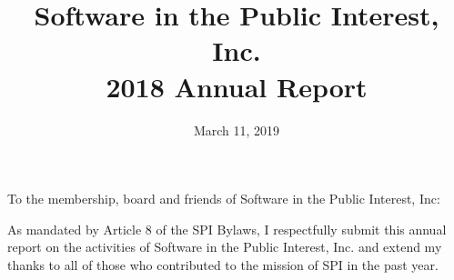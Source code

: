 \documentclass[a4paper]{report}
\begin{document}
\title{Software in the Public Interest, Inc.\\
2018 Annual Report}
\date{March 11, 2019}

\maketitle

\newpage


\hspace{1em}

To the membership, board and friends of Software in the Public Interest, Inc:

As mandated by Article 8 of the SPI Bylaws, I respectfully submit this annual
report on the activities of Software in the Public Interest, Inc. and extend my
thanks to all of those who contributed to the mission of SPI in the past year.
\end{document}
